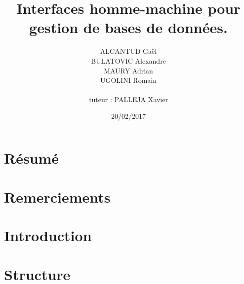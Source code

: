 \documentclass[12pt, a4paper, twoside, openright]{book}
\title{Interfaces homme-machine pour gestion de bases de données.}
\author{ALCANTUD Gaël \\ BULATOVIC Alexandre \\ MAURY Adrian \\ UGOLINI Romain \\ \\tuteur : PALLEJA Xavier}
\date{20/02/2017}
\begin{document}
\frontmatter
\maketitle

\thispagestyle{empty}
\chapter*{Résumé}


\thispagestyle{empty}
\chapter*{Remerciements}


\tableofcontents
\listoffigures
\printglossaries

\mainmatter
\chapter{Introduction}


\chapter{Structure}


\backmatter
\end{document}
